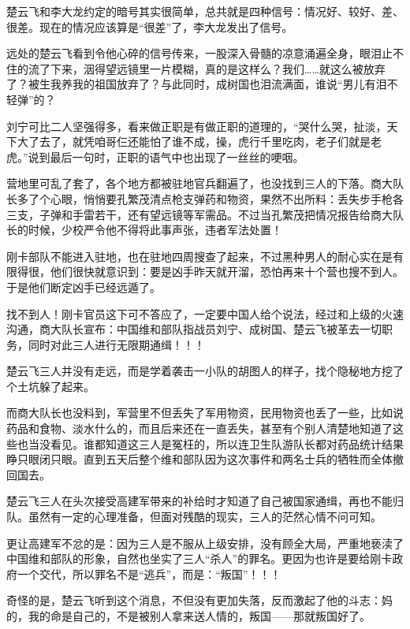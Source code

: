 楚云飞和李大龙约定的暗号其实很简单，总共就是四种信号：情况好、较好、差、很差。现在的情况应该算是“很差”了，李大龙发出了信号。

远处的楚云飞看到令他心碎的信号传来，一股深入骨髓的凉意涌遍全身，眼泪止不住的流了下来，洇得望远镜里一片模糊，真的是这样么？我们……就这么被放弃了？被生我养我的祖国放弃了？与此同时，成树国也泪流满面，谁说“男儿有泪不轻弹”的？

刘宁可比二人坚强得多，看来做正职是有做正职的道理的，“哭什么哭，扯淡，天下大了去了，就凭咱哥仨还能怕了谁不成，操，虎行千里吃肉，老子们就是老虎。”说到最后一句时，正职的语气中也出现了一丝丝的哽咽。

营地里可乱了套了，各个地方都被驻地官兵翻遍了，也没找到三人的下落。商大队长多了个心眼，悄悄要孔繁茂清点枪支弹药和物资，果然不出所料：丢失步手枪各三支，子弹和手雷若干，还有望远镜等军需品。不过当孔繁茂把情况报告给商大队长的时候，少校严令他不得将此事声张，违者军法处置！

刚卡部队不能进入驻地，也在驻地四周搜查了起来，不过黑种男人的耐心实在是有限得很，他们很快就意识到：要是凶手昨天就开溜，恐怕再来十个营也搜不到人。于是他们断定凶手已经远遁了。

找不到人！刚卡官员这下可不答应了，一定要中国人给个说法，经过和上级的火速沟通，商大队长宣布：中国维和部队指战员刘宁、成树国、楚云飞被革去一切职务，同时对此三人进行无限期通缉！！！

楚云飞三人并没有走远，而是学着袭击一小队的胡图人的样子，找个隐秘地方挖了个土坑躲了起来。

而商大队长也没料到，军营里不但丢失了军用物资，民用物资也丢了一些，比如说药品和食物、淡水什么的，而且后来还在一直丢失，甚至有个别人清楚地知道了这些也当没看见。谁都知道这三人是冤枉的，所以连卫生队游队长都对药品统计结果睁只眼闭只眼。直到五天后整个维和部队因为这次事件和两名士兵的牺牲而全体撤回国去。

楚云飞三人在头次接受高建军带来的补给时才知道了自己被国家通缉，再也不能归队。虽然有一定的心理准备，但面对残酷的现实，三人的茫然心情不问可知。

更让高建军不忿的是：因为三人是不服从上级安排，没有顾全大局，严重地亵渎了中国维和部队的形象，自然也坐实了三人“杀人”的罪名。更因为也许是要给刚卡政府一个交代，所以罪名不是“逃兵”，而是：“叛国”！！！

奇怪的是，楚云飞听到这个消息，不但没有更加失落，反而激起了他的斗志：妈的，我的命是自己的，不是被别人拿来送人情的，叛国——那就叛国好了。

